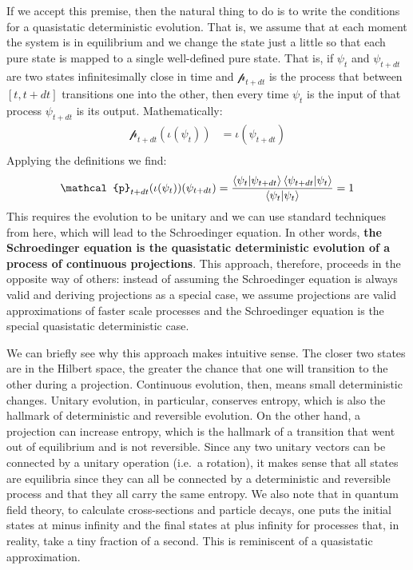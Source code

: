 \documentclass[applsci,article,submit,moreauthors,pdftex]{Definitions/mdpi}
\begin{document}
If we accept this premise, then the natural thing to do is to write the conditions for a quasistatic deterministic evolution. That is, we assume that at each moment the system is in equilibrium and we change the state just a little so that each pure state is mapped to a single well-defined pure state. That is, if $\psi_{t}$ and $\psi_{t+dt}$ are two states infinitesimally close in time and $\mathcal{p}_{t+dt}$ is the process that between $[t, t+dt]$ transitions one into the other, then every time $\psi_{t}$ is the input of that process $\psi_{t+dt}$ is its output. Mathematically:
\begin{equation}
\begin{aligned}
\mathcal{p}_{t+dt}(\iota(\psi_{t}))&=\iota(\psi_{t+dt}) \\
\end{aligned}
\end{equation}
Applying the definitions we find:
\begin{equation}
\begin{aligned}
\mathcal{p}_{t+dt}(\iota(\psi_{t}))(\psi_{t+dt}) &=
\frac{\braket{\psi_{t} | \psi_{t+dt}} \braket{\psi_{t+dt}|\psi_{t}}}{\braket{\psi_{t}|\psi_{t}}} = 1 \\
\end{aligned}
\end{equation}
This requires the evolution to be unitary and we can use standard techniques from here, which will lead to the Schroedinger equation. In other words, \textbf{the Schroedinger equation is the quasistatic deterministic evolution of a process of continuous projections}. This approach, therefore, proceeds in the opposite way of others: instead of assuming the Schroedinger equation is always valid and deriving projections as a special case, we assume projections are valid approximations of faster scale processes and the Schroedinger equation is the special quasistatic deterministic case.

We can briefly see why this approach makes intuitive sense. The closer two states are in the Hilbert space, the greater the chance that one will transition to the other during a projection. Continuous evolution, then, means small deterministic changes. Unitary evolution, in particular, conserves entropy, which is also the hallmark of deterministic and reversible evolution. On the other hand, a projection can increase entropy, which is the hallmark of a transition that went out of equilibrium and is not reversible. Since any two unitary vectors can be connected by a unitary operation (i.e.~a rotation), it makes sense that all states are equilibria since they can all be connected by a deterministic and reversible process and that they all carry the same entropy. We also note that in quantum field theory, to calculate cross-sections and particle decays, one puts the initial states at minus infinity and the final states at plus infinity for processes that, in reality, take a tiny fraction of a second. This is reminiscent of a quasistatic approximation.
\end{document}
